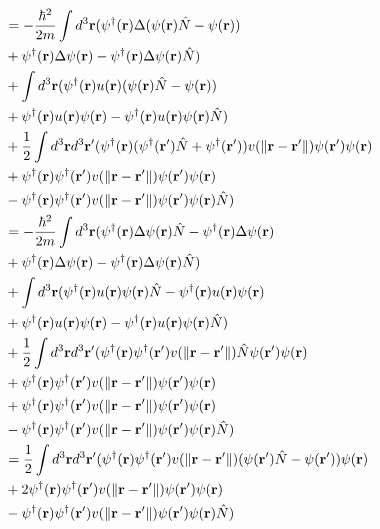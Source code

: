 \documentclass{article}
\begin{document}
\begin{align*}
&=-\frac{\hbar^2}{2m}\int d^3\vb{r}(\psi^\dagger(\vb{r})\Delta(\psi(\vb{r})\hat{N}-\psi(\vb{r}))\\
&+\psi^\dagger(\vb{r})\Delta\psi(\vb{r})-\psi^\dagger(\vb{r})\Delta\psi(\vb{r})\hat{N})\\
&+\int d^3\vb{r}(\psi^\dagger(\vb{r})u(\vb{r})(\psi(\vb{r})\hat{N}-\psi(\vb{r}))\\
&+\psi^\dagger(\vb{r})u(\vb{r})\psi(\vb{r})-\psi^\dagger(\vb{r})u(\vb{r})\psi(\vb{r})\hat{N})\\
&+\frac{1}{2}\int d^3\vb{r}d^3\vb{r}'(\psi^\dagger(\vb{r})(\psi^\dagger(\vb{r}')\hat{N}+\psi^\dagger(\vb{r}'))v(\|\vb{r}-\vb{r}'\|)\psi(\vb{r}')\psi(\vb{r})\\
&+\psi^\dagger(\vb{r})\psi^\dagger(\vb{r}')v(\|\vb{r}-\vb{r}'\|)\psi(\vb{r}')\psi(\vb{r})\\
&-\psi^\dagger(\vb{r})\psi^\dagger(\vb{r}')v(\|\vb{r}-\vb{r}'\|)\psi(\vb{r}')\psi(\vb{r})\hat{N})\\
&=-\frac{\hbar^2}{2m}\int d^3\vb{r}(\psi^\dagger(\vb{r})\Delta\psi(\vb{r})\hat{N}-\psi^\dagger(\vb{r})\Delta\psi(\vb{r})\\
&+\psi^\dagger(\vb{r})\Delta\psi(\vb{r})-\psi^\dagger(\vb{r})\Delta\psi(\vb{r})\hat{N})\\
&+\int d^3\vb{r}(\psi^\dagger(\vb{r})u(\vb{r})\psi(\vb{r})\hat{N}-\psi^\dagger(\vb{r})u(\vb{r})\psi(\vb{r})\\
&+\psi^\dagger(\vb{r})u(\vb{r})\psi(\vb{r})-\psi^\dagger(\vb{r})u(\vb{r})\psi(\vb{r})\hat{N})\\
&+\frac{1}{2}\int d^3\vb{r}d^3\vb{r}'(\psi^\dagger(\vb{r})\psi^\dagger(\vb{r}')v(\|\vb{r}-\vb{r}'\|)\hat{N}\psi(\vb{r}')\psi(\vb{r})\\
&+\psi^\dagger(\vb{r})\psi^\dagger(\vb{r}')v(\|\vb{r}-\vb{r}'\|)\psi(\vb{r}')\psi(\vb{r})\\
&+\psi^\dagger(\vb{r})\psi^\dagger(\vb{r}')v(\|\vb{r}-\vb{r}'\|)\psi(\vb{r}')\psi(\vb{r})\\
&-\psi^\dagger(\vb{r})\psi^\dagger(\vb{r}')v(\|\vb{r}-\vb{r}'\|)\psi(\vb{r}')\psi(\vb{r})\hat{N})\\
&=\frac{1}{2}\int d^3\vb{r}d^3\vb{r}'(\psi^\dagger(\vb{r})\psi^\dagger(\vb{r}')v(\|\vb{r}-\vb{r}'\|)(\psi(\vb{r}')\hat{N}-\psi(\vb{r}'))\psi(\vb{r})\\
&+2\psi^\dagger(\vb{r})\psi^\dagger(\vb{r}')v(\|\vb{r}-\vb{r}'\|)\psi(\vb{r}')\psi(\vb{r})\\
&-\psi^\dagger(\vb{r})\psi^\dagger(\vb{r}')v(\|\vb{r}-\vb{r}'\|)\psi(\vb{r}')\psi(\vb{r})\hat{N})\\

\end{align*}
\end{document}
